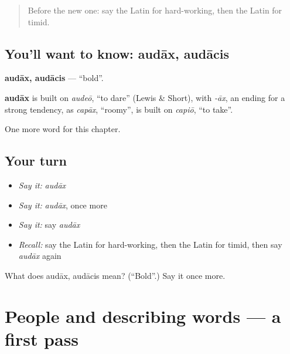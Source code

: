 \label{lesson:LA-C150-audax}



\begin{quote}
Before the new one: say the Latin for hard-working, then the Latin for timid.
\end{quote}

\subsection*{You'll want to know: audāx, audācis}
\textbf{audāx, audācis} — \textquotedblleft{}bold\textquotedblright{}.

\begin{cousinweb}
\textbf{audāx} is built on \emph{audeō}, \textquotedblleft{}to dare\textquotedblright{} (Lewis \& Short), with \emph{-āx}, an ending for a strong tendency, as \emph{capāx}, \textquotedblleft{}roomy\textquotedblright{}, is built on \emph{capiō}, \textquotedblleft{}to take\textquotedblright{}.
\end{cousinweb}

\begin{grammarlens}[title={What you've built}]
One more word for this chapter.
\end{grammarlens}

\subsection*{Your turn}
\begin{itemize}
\raggedright
  \item \emph{Say it:} \emph{audāx}
  \item \emph{Say it:} \emph{audāx}, once more
  \item \emph{Say it:} say \emph{audāx}
  \item \emph{Recall:} say the Latin for hard-working, then the Latin for timid, then say \emph{audāx} again
\end{itemize}

\begin{tcolorbox}[breakable,colback=teal!4,colframe=teal!35!black,title={Before you move on}]
What does audāx, audācis mean? (\textquotedblleft{}Bold\textquotedblright{}.) Say it once more.
\end{tcolorbox}
\section[(dialogue)]{People and describing words — a first pass}


